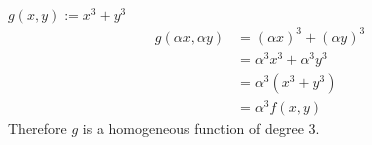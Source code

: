 $g(x,y) := x^3 + y^3$
\begin{align*}
    g(\alpha x, \alpha y) &= (\alpha x)^3 + (\alpha y)^3 \\
    &= \alpha^3 x^3 + \alpha^3 y^3\\
    &= \alpha^3 (x^3 + y^3)\\
    &= \alpha^3 f(x,y)
\end{align*}
Therefore $g$ is a homogeneous function of degree 3.
